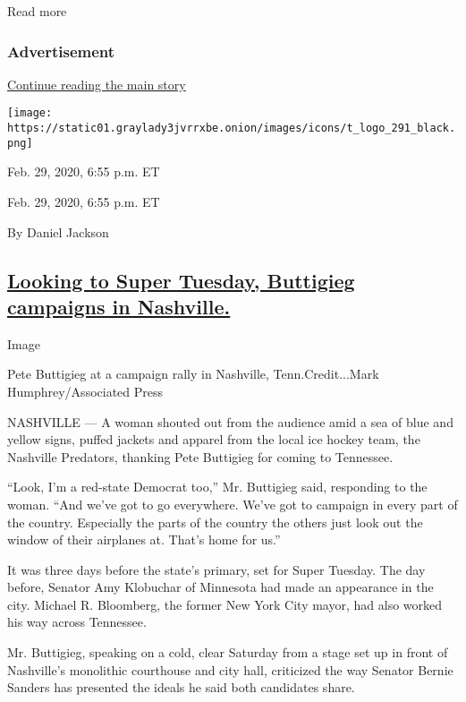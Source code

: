 Read more

\hypertarget{advertisement-3}{%
\subsubsection{Advertisement}\label{advertisement-3}}

\protect\hyperlink{after-dfp-ad-mid4}{Continue reading the main story}

\texttt{[image: https://static01.graylady3jvrrxbe.onion/images/icons/t\_logo\_291\_black.png]}

Feb. 29, 2020, 6:55 p.m. ET

Feb. 29, 2020, 6:55 p.m. ET

By Daniel Jackson

\hypertarget{looking-to-super-tuesday-buttigieg-campaigns-in-nashville}{%
\subsection{\texorpdfstring{\protect\hyperlink{pete-buttigieg-nashville}{Looking
to Super Tuesday, Buttigieg campaigns in
Nashville.}}{Looking to Super Tuesday, Buttigieg campaigns in Nashville.}}\label{looking-to-super-tuesday-buttigieg-campaigns-in-nashville}}

Image

Pete Buttigieg at a campaign rally in Nashville, Tenn.Credit...Mark
Humphrey/Associated Press

NASHVILLE --- A woman shouted out from the audience amid a sea of blue
and yellow signs, puffed jackets and apparel from the local ice hockey
team, the Nashville Predators, thanking Pete Buttigieg for coming to
Tennessee.

``Look, I'm a red-state Democrat too,'' Mr. Buttigieg said, responding
to the woman. ``And we've got to go everywhere. We've got to campaign in
every part of the country. Especially the parts of the country the
others just look out the window of their airplanes at. That's home for
us.''

It was three days before the state's primary, set for Super Tuesday. The
day before, Senator Amy Klobuchar of Minnesota had made an appearance in
the city. Michael R. Bloomberg, the former New York City mayor, had also
worked his way across Tennessee.

Mr. Buttigieg, speaking on a cold, clear Saturday from a stage set up in
front of Nashville's monolithic courthouse and city hall, criticized the
way Senator Bernie Sanders has presented the ideals he said both
candidates share.

